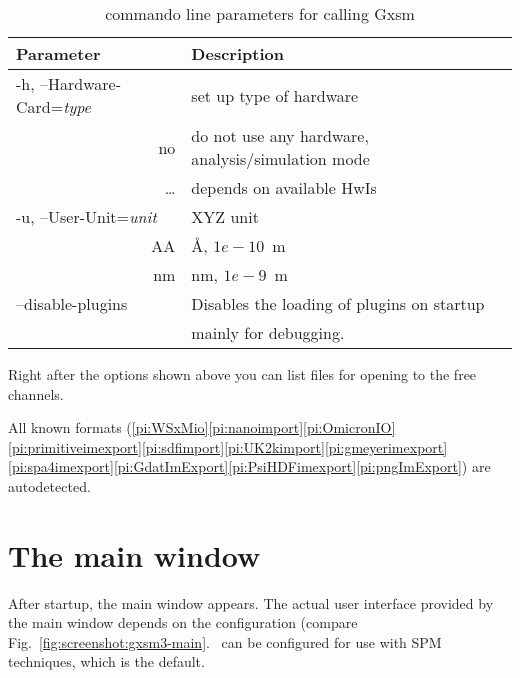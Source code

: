 \begin{table}[hb]
  \begin{center}
    \begin{tabular}{|l|l|} \hline
      Parameter        & Description\\ \hline \hline    
        -h, --Hardware-Card={\textit{type}} & set up type of hardware\\
\multicolumn{1}{|r|}{ no } &  do not use any hardware, analysis/simulation mode\\
\multicolumn{1}{|r|}{ \dots } &  depends on available HwIs \\
\hline

        -u, --User-Unit={\textit{unit}} & XYZ unit\\
\multicolumn{1}{|r|}{ AA  } & \AA, $1e-10$~m \\
\multicolumn{1}{|r|}{ nm  } & nm, $1e-9$~m \\ \hline

       --disable-plugins & Disables the loading of plugins on startup\\
                         & mainly for debugging.\\ \hline

    \end{tabular}
    \caption{commando line parameters for calling Gxsm}
    \label{tab:command-line}
  \end{center}
\end{table}

Right after the options shown above you can list files for opening to the free channels.

All known formats (\ref{pi:WSxMio}\ref{pi:nanoimport}\ref{pi:OmicronIO}\ref{pi:primitiveimexport}\ref{pi:sdfimport}\ref{pi:UK2kimport}\ref{pi:gmeyerimexport}\ref{pi:spa4imexport}\ref{pi:GdatImExport}\ref{pi:PsiHDFimexport}\ref{pi:pngImExport}) are autodetected.


\chapter{The main window}
\label{ch:main}

After startup, the main window appears.  The actual user interface provided by the main window depends on the configuration (compare Fig.~\ref{fig:screenshot:gxsm3-main}. \Gxsm\ can be configured for use with SPM techniques, which is the default.

